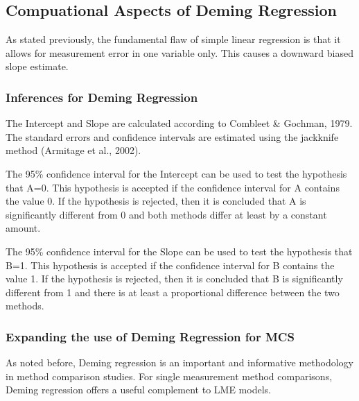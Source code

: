 \documentclass[12pt, a4paper]{report}
\theoremstyle{plain}
\theoremstyle{definition}
\theoremstyle{remark}
\begin{document}
	
	\subsection{Compuational Aspects of Deming Regression}
	
	
	
	
	
	
	
	
	
	As stated previously, the fundamental flaw of simple linear regression is that it allows for measurement error in one variable only. This causes a downward biased slope estimate.
	
	
	

	
	
	
	
	
	
	
	
	
	\subsubsection{Inferences for Deming Regression}
	The Intercept and Slope are calculated according to Combleet \& Gochman, 1979. The standard errors and confidence intervals are estimated using the jackknife method (Armitage et al., 2002).
	
	The 95\% confidence interval for the Intercept can be used to test the hypothesis that A=0. This hypothesis is accepted if the confidence interval for A contains the value 0. If the hypothesis is rejected, then it is concluded that A is significantly different from 0 and both methods differ at least by a constant amount.
	
	The 95\% confidence interval for the Slope can be used to test the hypothesis that B=1. This hypothesis is accepted if the confidence interval for B contains the value 1. If the hypothesis is rejected, then it is concluded that B is significantly different from 1 and there is at least a proportional difference between the two methods.
	
	
	
	
	
	
	\subsubsection{Expanding the use of Deming Regression for MCS}
	As noted before, Deming regression is an important and informative methodology in method comparison studies.
	For single measurement method comparisons, Deming regression offers a useful complement to LME models.
	
\end{document}
